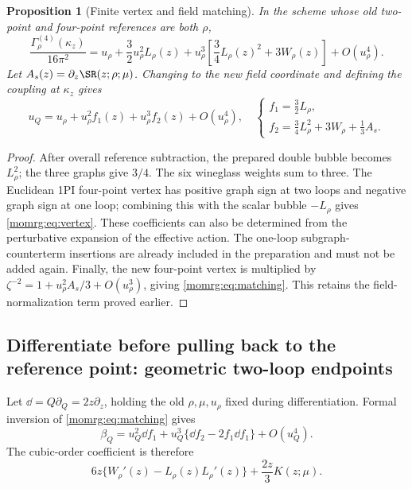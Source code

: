 \documentclass[11pt,a4paper,oneside]{article}
\theoremstyle{plain}
\newtheorem{proposition}[theorem]{Proposition}
\theoremstyle{definition}
\theoremstyle{remark}
\numberwithin{equation}{section}
\begin{document}
\begin{proposition}[Finite vertex and field matching]\label{momrg:prop:vertex}
In the scheme whose old two-point and four-point references are both $\rho$,
\begin{equation}\label{momrg:eq:vertex}
 \frac{\Gamma_\rho^{(4)}(\kappa_z)}{16\pi^2}
 =u_\rho+\frac32u_\rho^2L_\rho(z)
    +u_\rho^3\left[\frac34L_\rho(z)^2+3W_\rho(z)\right]
    +O(u_\rho^4).
\end{equation}
Let $A_s(z)=\partial_z\SR(z;\rho;\mu)$.
Changing to the new field coordinate and defining the coupling at $\kappa_z$ gives
\begin{equation}\label{momrg:eq:matching}
 u_Q=u_\rho+u_\rho^2 f_1(z)+u_\rho^3 f_2(z)+O(u_\rho^4),
 \quad
 \begin{cases}
 f_1=\frac32L_\rho,\\
 f_2=\frac34L_\rho^2+3W_\rho+\frac13A_s.
 \end{cases}
\end{equation}
\end{proposition}
\begin{proof}
After overall reference subtraction, the prepared double bubble becomes $L_\rho^2$;
the three graphs give $3/4$. The six wineglass weights sum to three.
The Euclidean 1PI four-point vertex has positive graph sign at two loops and negative graph sign at one loop;
combining this with the scalar bubble $-L_\rho$ gives \eqref{momrg:eq:vertex}.
These coefficients can also be determined from the perturbative expansion of the effective action.
The one-loop subgraph-counterterm insertions are already included in the preparation and must not be added again.
Finally, the new four-point vertex is multiplied by
$\zeta^{-2}=1+u_\rho^2 A_s/3+O(u_\rho^3)$,
giving \eqref{momrg:eq:matching}.
This retains the field-normalization term proved earlier.
\end{proof}


\subsection{Differentiate before pulling back to the reference point: geometric two-loop endpoints}\label{momrg:sec:beta}
Let $\dd=Q\partial_Q=2z\partial_z$, holding the old $\rho,\mu,u_\rho$ fixed during differentiation.
Formal inversion of \eqref{momrg:eq:matching} gives
\begin{equation}\label{momrg:eq:beta-old}
 \beta_Q=u_Q^2\dd f_1+
 u_Q^3\{\dd f_2-2f_1\dd f_1\}+O(u_Q^4).
\end{equation}
The cubic-order coefficient is therefore
\begin{equation}\label{momrg:eq:beta-combination}
 6z\{W_\rho'(z)-L_\rho(z)L_\rho'(z)\}
                   +\frac{2z}{3}K(z;\mu).
\end{equation}
\end{document}
